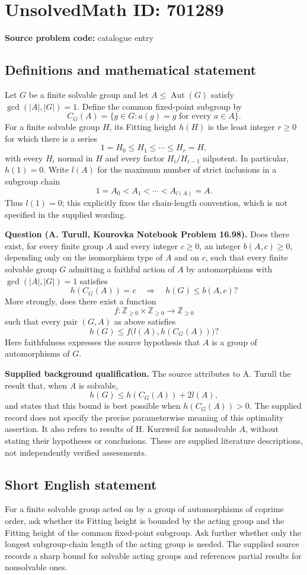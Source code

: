 \documentclass[11pt]{article}
\newcommand{\Z}{\mathbb{Z}}
\begin{document}
\section*{UnsolvedMath ID: 701289}
\textbf{Source problem code:} catalogue entry
\subsection{Definitions and mathematical statement}
Let \(G\) be a finite solvable group and let \(A\leq \operatorname{Aut}(G)\) satisfy \(\gcd(|A|,|G|)=1\). Define the common fixed-point subgroup by
\[
C_G(A)=\{g\in G: a(g)=g\text{ for every }a\in A\}.
\]
For a finite solvable group \(H\), its Fitting height \(h(H)\) is the least integer \(r\geq 0\) for which there is a series
\[
1=H_0\leq H_1\leq\cdots\leq H_r=H,
\]
with every \(H_i\) normal in \(H\) and every factor \(H_i/H_{i-1}\) nilpotent. In particular, \(h(1)=0\). Write \(l(A)\) for the maximum number of strict inclusions in a subgroup chain
\[
1=A_0<A_1<\cdots<A_{l(A)}=A.
\]
Thus \(l(1)=0\); this explicitly fixes the chain-length convention, which is not specified in the supplied wording.

\textbf{Question (A. Turull, Kourovka Notebook Problem 16.98).} Does there exist, for every finite group \(A\) and every integer \(c\geq 0\), an integer \(b(A,c)\geq 0\), depending only on the isomorphism type of \(A\) and on \(c\), such that every finite solvable group \(G\) admitting a faithful action of \(A\) by automorphisms with \(\gcd(|A|,|G|)=1\) satisfies
\[
h(C_G(A))=c\quad\Longrightarrow\quad h(G)\leq b(A,c)?
\]
More strongly, does there exist a function
\[
f:\Z_{\geq 0}\times\Z_{\geq 0}\longrightarrow\Z_{\geq 0}
\]
such that every pair \((G,A)\) as above satisfies
\[
h(G)\leq f\bigl(l(A),h(C_G(A))\bigr)?
\]
Here faithfulness expresses the source hypothesis that \(A\) is a group of automorphisms of \(G\).

\textbf{Supplied background qualification.} The source attributes to A. Turull the result that, when \(A\) is solvable,
\[
h(G)\leq h(C_G(A))+2l(A),
\]
and states that this bound is best possible when \(h(C_G(A))>0\). The supplied record does not specify the precise parameterwise meaning of this optimality assertion. It also refers to results of H. Kurzweil for nonsolvable \(A\), without stating their hypotheses or conclusions. These are supplied literature descriptions, not independently verified assessments.
\subsection{Short English statement}
For a finite solvable group acted on by a group of automorphisms of coprime order, ask whether its Fitting height is bounded by the acting group and the Fitting height of the common fixed-point subgroup. Ask further whether only the longest subgroup-chain length of the acting group is needed. The supplied source records a sharp bound for solvable acting groups and references partial results for nonsolvable ones.
\end{document}
